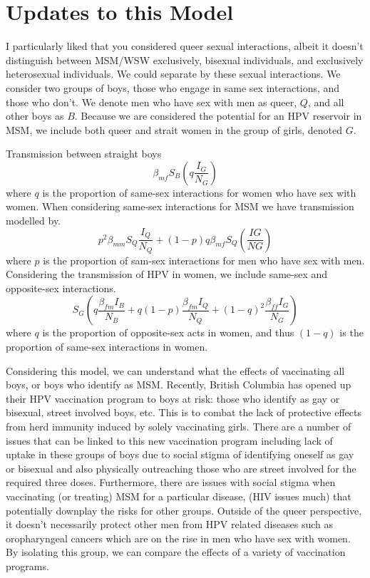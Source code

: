 \documentclass[12pt]{article}
\begin{document}
\section{Updates to this Model}

I particularly liked that you considered queer sexual interactions, albeit it doesn't distinguish between MSM/WSW exclusively, bisexual individuals, and exclusively heterosexual individuals.  We could separate by these sexual interactions.  We consider two groups of boys, those who engage in same sex interactions, and those who don't.  We denote men who have sex with men as queer, $Q$, and all other boys as $B$.  Because we are considered the potential for an HPV reservoir in MSM, we include both queer and strait women in the group of girls, denoted $G$.  
 
Transmission between straight boys
\begin{equation}
\beta_{mf}S_{B}\left(q\frac{I_{G}}{N_{G}}\right)
\end{equation}
where $q$ is the proportion of same-sex interactions for women who have sex with women. When considering same-sex interactions for MSM we have transmission modelled by.
\begin{equation}
p^2\beta_{mm}S_{Q}\frac{I_{Q}}{N_{Q}}+(1-p)q\beta_{mf}S_Q\left(\frac{IG}{NG}\right)
\end{equation}
where $p$ is the proportion of sam-sex interactions for men who have sex with men.  Considering the transmission of HPV in women, we include same-sex and opposite-sex interactions.  
\begin{equation}
S_G\left(q\frac{\beta_{fm}I_B}{N_B}+q(1-p)\frac{\beta_{fm}I_Q}{N_Q}+(1-q)^2\frac{\beta_{ff}I_G}{N_G}\right)
\end{equation}
where $q$ is the proportion of opposite-sex acts in women, and thus $(1-q)$ is the proportion of same-sex interactions in women.  


Considering this model, we can understand what the effects of vaccinating all boys, or boys who identify as MSM.  Recently, British Columbia has opened up their HPV vaccination program to boys at risk: those who identify as gay or bisexual, street involved boys, etc. This is to combat the lack of protective effects from herd immunity induced by solely vaccinating girls.  There are a number of issues that can be linked to this new vaccination program including lack of uptake in these groups of boys due to social stigma of identifying oneself as gay or bisexual and also physically outreaching those who are street involved for the required three doses. Furthermore, there are issues with social stigma when vaccinating (or treating) MSM for a particular disease, (HIV issues much) that potentially downplay the risks for other groups.  Outside of the queer perspective, it doesn't necessarily protect other men from HPV related diseases such as oropharyngeal cancers which are on the rise in men who have sex with women.  By isolating this group, we can compare the effects of a variety of vaccination programs. 
\end{document}
